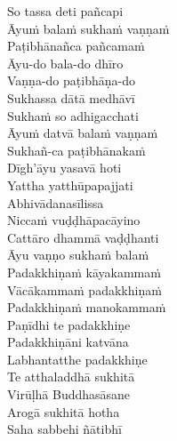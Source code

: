 \begin{verses}
  So tassa deti pañcapi\\
  Āyuṁ balaṁ sukhaṁ vaṇṇaṁ\\
  Paṭibhānañca pañcamaṁ\hyperlink{endnote122-appendix}{\hypertarget{endnote122-body}{}}\\
  Āyu-do bala-do dhīro\\
  Vaṇṇa-do paṭibhāṇa-do\\
  Sukhassa dātā medhāvī\\
  Sukhaṁ so adhigacchati\\
  Āyuṁ datvā balaṁ vaṇṇaṁ\\
  Sukhañ-ca paṭibhānakaṁ\hyperlink{endnote123-appendix}{\hypertarget{endnote123-body}{}}\\
  Dīgh'āyu yasavā hoti\\
  Yattha yatthūpapajjati\\
  Abhivādanasīlissa\\
  Niccaṁ vuḍḍhāpacāyino\\
  Cattāro dhammā vaḍḍhanti\\
  Āyu vaṇṇo sukhaṁ balaṁ\\
  Padakkhiṇaṁ kāyakammaṁ\\
  Vācākammaṁ padakkhiṇaṁ\\
  Padakkhiṇaṁ manokammaṁ\\
  Paṇīdhi te padakkhiṇe\\
  Padakkhiṇāni katvāna\\
  Labhantatthe padakkhiṇe\\
  Te atthaladdhā sukhitā\\
  Virūḷhā Buddhasāsane\\
  Arogā sukhitā hotha\\
  Saha sabbehi ñātibhī
\end{verses}

